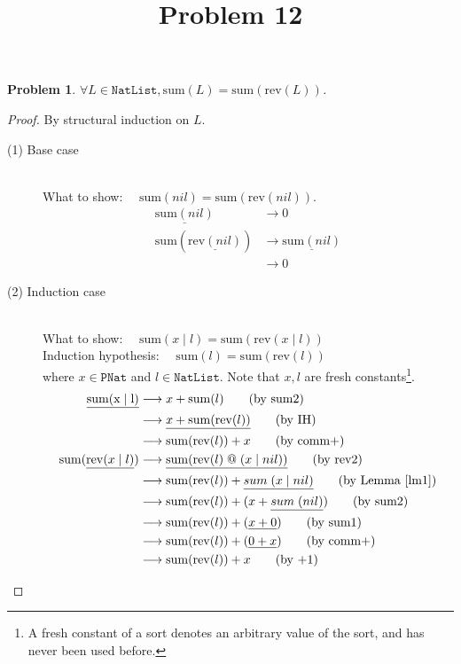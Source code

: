 \documentclass[12pt, a4paper]{article}
\title{Problem 12}
\date{\vspace{-5ex}}
\newtheorem{problem}{Problem}
\newcommand{\rel}[1]{\mathrel{#1}}
\newcommand{\rmx}[1]{\mathrm{#1}}
\newcommand{\larrow}{\longrightarrow}
\newcommand{\under}{\underline}
\begin{document}
\maketitle

\begin{problem}
$\forall L \in \mathtt{NatList}, \rmx{sum}(L) = \rmx{sum}(\rmx{rev}(L))$.
\end{problem}
\begin{proof}
By structural induction on $L$.

\begin{description}
\item[(1) Base case]~\\
\noindent
What to show: $\quad \rmx{sum}(nil) = \rmx{sum}(\rmx{rev}(nil))$.
\begin{align*}
\under{\rmx{sum}(nil)} &\larrow 0 \tag{by sum1} \\
\rmx{sum}(\under{\rmx{rev}(nil)})
	&\larrow \under{\rmx{sum}(nil)} \tag{by rev1} \\
	&\larrow 0 \tag{by sum1}
\end{align*}

\item[(2) Induction case]~\\
What to show: $\quad \rmx{sum}(x \mid l) = \rmx{sum}(\rmx{rev}(x \mid l))$ \\
Induction hypothesis: $\quad \rmx{sum}(l) = \rmx{sum}(\rmx{rev}(l))$  \\
where $x \in \mathtt{PNat}$ and $l \in \mathtt{NatList}$.
Note that $x, l$ are fresh constants\footnote{A fresh constant of a sort denotes an arbitrary value of the sort, and has never been used before.}.
\begin{align*}
\under{\rmx{sum(x \mid l)}}
	&\larrow x + \rmx{sum}(l) \tag{by sum2} \\
	&\larrow \under{x + \rmx{sum}(\rmx{rev}(l))} \tag{by IH} \\
	&\larrow \rmx{sum}(\rmx{rev}(l)) + x \tag{by comm+} \\
\rmx{sum}(\under{\rmx{rev}(x \mid l)})
	&\larrow \under{\rmx{sum}(\rmx{rev}(l) \rel{@} (x \mid nil))} \tag{by rev2} \\
	&\larrow \rmx{sum}(\rmx{rev}(l)) + \under{\rel{sum}(x \mid nil)} \tag{by Lemma~\ref{lm1}} \\
	&\larrow \rmx{sum}(\rmx{rev}(l)) + (x + \under{\rel{sum}(nil)}) \tag{by sum2} \\
	&\larrow \rmx{sum}(\rmx{rev}(l)) + (\under{x + 0}) \tag{by sum1} \\
	&\larrow \rmx{sum}(\rmx{rev}(l)) + (\under{0 + x}) \tag{by comm+} \\
	&\larrow \rmx{sum}(\rmx{rev}(l)) + x \tag{by +1}
\end{align*}
\end{description}

\end{proof}
\end{document}
